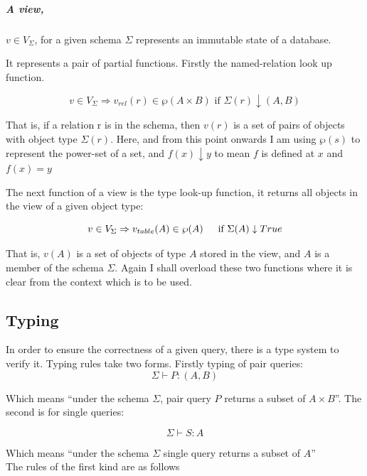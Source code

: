 \documentclass[12pt,a4paper,twoside,openright]{report}
\begin{document}
\subparagraph{A view,} $v \in V_\Sigma$, for a given schema $\Sigma$ represents an immutable state of a database.

It represents a pair of partial functions. Firstly the named-relation look up function.

\begin{equation}
v \in V_\Sigma \Rightarrow v_{rel}(r) \in \wp(A \times B)\mbox{ if $\Sigma(r)\downarrow (A, B)$}
\end{equation} 

That is, if a relation r is in the schema, then $v(r)$ is a set of pairs of objects with object type $\Sigma(r)$. Here, and from this point onwards I am using $\wp(s)$ to represent the power-set of a set, and $f(x) \downarrow y$ to mean $f$ is defined at $x$ and $f(x)=y$


The next function of a view is the type look-up function, it returns all objects in the view of a given object type:

\begin{equation}
v \in V_\Sigma \Rightarrow v_{table}(A) \in \wp(A)\indent \mbox{if $\Sigma(A)\downarrow True$}
\end{equation} 

That is, $v(A)$ is a set of objects of type $A$ stored in the view, and $A$ is a member of the schema $\Sigma$. Again I shall overload these two functions where it is clear from the context which is to be used.
 
\subsection{Typing}
In order to ensure the correctness of a given query, there is a type system to verify it. Typing rules take two forms. Firstly typing of pair queries:
\[ \Sigma \vdash P\colon (A, B)\]

Which means ``under the schema $\Sigma$, pair query $P$ returns a subset of $A \times B$''.  The second is for single queries:

\[ \Sigma \vdash S \colon A \]

Which means ``under the schema $\Sigma$ single query returns a subset of $A$''\\

The rules of the first kind are as follows
\end{document}
